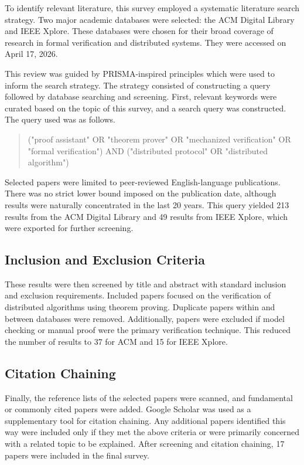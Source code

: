 \documentclass[acmsmall,screen,review]{acmart}
\begin{document}
  To identify relevant literature, this survey employed a systematic literature search strategy. 
  Two major academic databases were selected: the ACM Digital Library and IEEE Xplore. 
  These databases were chosen for their broad coverage of research in formal verification and distributed systems.
  They were accessed on April 17, 2026.

  This review was guided by PRISMA-inspired principles which were used to inform the search strategy.
  The strategy consisted of constructing a query followed by database searching and screening.
  First, relevant keywords were curated based on the topic of this survey, and a search query was constructed.
  The query used was as follows.

  \begin{quote}
    ("proof assistant" OR "theorem prover" OR "mechanized verification" OR "formal verification")
    AND 
    ("distributed protocol" OR "distributed algorithm")
  \end{quote}


  Selected papers were limited to peer-reviewed English-language publications.
  There was no strict lower bound imposed on the publication date, although results were naturally concentrated in the last 20 years.
  This query yielded 213 results from the ACM Digital Library and 49 results from IEEE Xplore, which were exported for further screening.

\subsection{Inclusion and Exclusion Criteria}

  These results were then screened by title and abstract with standard inclusion and exclusion requirements.
  Included papers focused on the verification of distributed algorithms using theorem proving.
  Duplicate papers within and between databases were removed. 
  Additionally, papers were excluded if model checking or manual proof were the primary verification technique.
  This reduced the number of results to 37 for ACM and 15 for IEEE Xplore. 

\subsection{Citation Chaining}
  Finally, the reference lists of the selected papers were scanned, and fundamental or commonly cited papers were added.
  Google Scholar was used as a supplementary tool for citation chaining.
  Any additional papers identified this way were included only if they met the above criteria or were primarily concerned with a related topic to be explained.
  After screening and citation chaining, 17 papers were included in the final survey.
\end{document}
